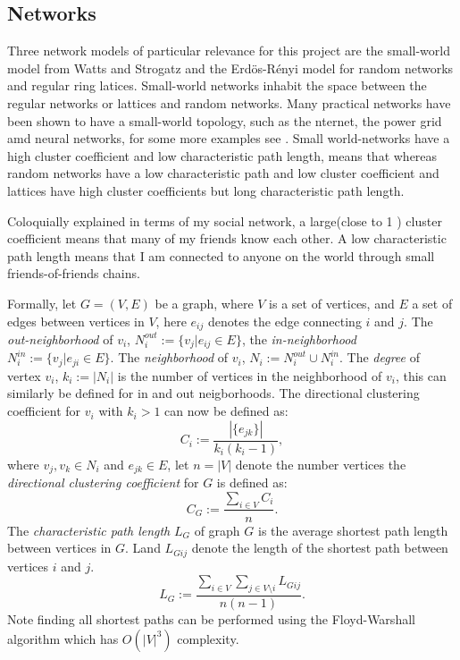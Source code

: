 %
\subsection{Networks}

Three network models of particular relevance for this project are the small-world model \cite{watts1998collective} from Watts and Strogatz and the Erd\"{o}s-R\'{e}nyi model for random networks \cite{erdos1960evolution} and regular ring latices. Small-world networks inhabit the space between the regular networks or lattices and random networks. Many practical networks have been shown to have a small-world topology, such as the nternet, the power grid amd neural networks,  for some more examples see \cite{albert2002statistical}. Small world-networks have a high cluster coefficient and low characteristic path length, means that  whereas random networks have a low characteristic path and low cluster coefficient and lattices have high cluster coefficients but long characteristic path length.

Coloquially explained in terms of my social network, a large(close to 1 ) cluster coefficient means that many of my friends know each other. A low characteristic path length means that I am connected to anyone on the world through small friends-of-friends chains.

Formally, let $G=(V, E)$ be a graph, where $V$ is a set of vertices, and $E$ a set of edges between vertices in $V$, here $e_{ij}$ denotes the edge connecting $i$ and $j$.  The \textit{out-neighborhood} of $v_i$, $N_i^{out}:=\{v_j|e_{ij}\in E\}$, the \textit{in-neighborhood} $N_i^{in}:=\{v_j|e_{ji}\in E\}$. The \textit{neighborhood} of $v_i$, $N_i:=N_i^{out}\cup N_i^{in}$. The \textit{degree} of vertex $v_i$, $k_i:=|N_i|$ is the number of vertices in the neighborhood of $v_i$, this can similarly be defined for in and out neigborhoods. The directional clustering coefficient for $v_i$ with $k_i>1$ can now be defined as:
$$C_i :=\frac{|\{e_{jk}\}|}{k_i(k_i-1)},$$
where $v_j,v_k\in N_i$ and $e_{jk}\in E$, let $n=|V|$ denote the number vertices the \textit{directional clustering coefficient} for $G$ is defined as:
$$C_G:=\frac{\sum_{i\in V} C_i}{n}.$$
The \textit{characteristic path length} $L_G$ of graph $G$ is the average shortest path length between vertices in $G$. Land  $L_{Gij}$ denote the length of the shortest path between vertices $i$ and $j$. 
$$L_G:= \frac{\sum_{i\in V} \sum_{j \in V\setminus i}L_{Gij}}{n(n-1)}.$$ 
Note finding all shortest paths can be performed using the Floyd-Warshall algorithm which has $O(|V|^3)$ complexity\cite{Floyd}.

